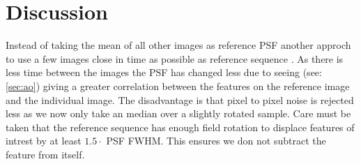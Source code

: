 \chapter{Discussion}

Instead of taking the mean of all other images as reference \ac{PSF} another approch to use a few images close in time as possible as reference sequence \cite{Marois_2006}. As there is less time between the images the \ac{PSF} has changed less due to seeing  (see: \autoref{sec:ao}) giving a greater correlation between the features on the reference image and the individual image. The disadvantage is that pixel to pixel noise is rejected less as we now only take an median over a slightly rotated sample. Care must be taken that the reference sequence has enough field rotation to displace features of intrest by at least $1.5 \cdot$ \ac{PSF} \ac{FWHM}. This ensures we don not subtract the feature from itself. 
